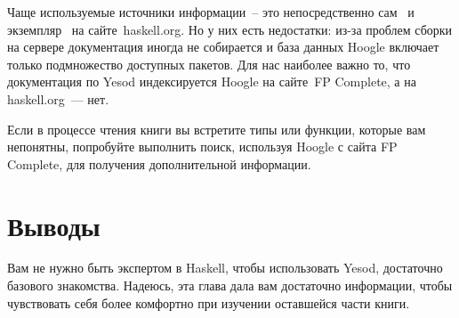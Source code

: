 Чаще используемые источники информации~-- это непосредственно сам~%
 и экземпляр~%
 на сайте~haskell.org. Но у
них есть недостатки: из-за проблем сборки на сервере документация иногда не
собирается и база данных Hoogle включает только подмножество доступных пакетов.
Для нас наиболее важно то, что документация по Yesod индексируется Hoogle на
сайте~FP Complete, а на haskell.org~--- нет.

Если в процессе чтения книги вы встретите типы или функции, которые вам
непонятны, попробуйте выполнить поиск, используя Hoogle с сайта FP Complete, для
получения дополнительной информации.

\section{Выводы}

Вам не нужно быть экспертом в Haskell, чтобы использовать Yesod, достаточно
базового знакомства. Надеюсь, эта глава дала вам достаточно информации, чтобы
чувствовать себя более комфортно при изучении оставшейся части книги.
